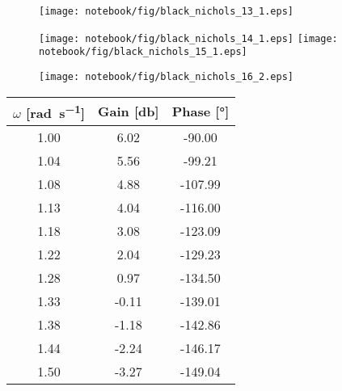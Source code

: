 \begin{figure}[!h]
\begin{center}
    \texttt{[image: notebook/fig/black\_nichols\_13\_1.eps]}
\end{center}
    \caption{}
\end{figure}
    
\begin{figure}[!h]
\begin{center}
    \texttt{[image: notebook/fig/black\_nichols\_14\_1.eps]}
    \texttt{[image: notebook/fig/black\_nichols\_15\_1.eps]}
\end{center}
\end{figure}

\begin{figure}[!h]
\begin{center}
    \texttt{[image: notebook/fig/black\_nichols\_16\_2.eps]}
\end{center}
\end{figure}

\begin{center}
\begin{tabular}{ccc}
\hline
$\omega$ [\si{\radian\per\second}] & Gain [\si{\decibel}] & Phase [\si{\degree}]\\
\hline
1.00 & 6.02 & -90.00\\
1.04 & 5.56 & -99.21\\
1.08 & 4.88 & -107.99\\
1.13 & 4.04 & -116.00\\
1.18 & 3.08 & -123.09\\
1.22 & 2.04 & -129.23\\
1.28 & 0.97 & -134.50\\
1.33 & -0.11 & -139.01\\
1.38 & -1.18 & -142.86\\
1.44 & -2.24 & -146.17\\
1.50 & -3.27 & -149.04\\
\hline
\end{tabular}
\end{center}

